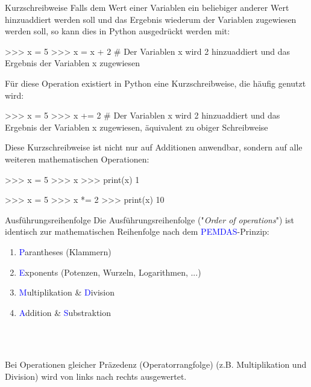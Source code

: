         \begin{frame}{Kurzschreibweise}
            Falls dem Wert einer Variablen  ein beliebiger anderer Wert hinzuaddiert werden soll und das Ergebnis wiederum der Variablen  zugewiesen werden soll, so kann dies in Python ausgedrückt werden mit:
\begin{pythoncode}
>>> x = 5
>>> x = x + 2 # Der Variablen x wird 2 hinzuaddiert und das Ergebnis der Variablen x zugewiesen
\end{pythoncode}

        Für diese Operation existiert in Python eine Kurzschreibweise, die häufig genutzt wird:
\begin{pythoncode}
>>> x = 5
>>> x += 2 # Der Variablen x wird 2 hinzuaddiert und das Ergebnis der Variablen x zugewiesen, äquivalent zu obiger Schreibweise
\end{pythoncode}

        Diese Kurzschreibweise ist nicht nur auf Additionen anwendbar, sondern auf alle weiteren mathematischen Operationen:
\begin{pythoncode}
>>> x = 5
>>> x %
>>> print(x)
1

>>> x = 5
>>> x *= 2
>>> print(x)
10
\end{pythoncode}
        \end{frame}
        
        
        \begin{frame}[fragile]{Ausführungsreihenfolge}
            Die Ausführungsreihenfolge ("\textit{Order of operations}") ist identisch zur mathematischen Reihenfolge nach dem \textcolor{blue}{PEMDAS}-Prinzip:
            
            \begin{enumerate}
                \item \textcolor{blue}{P}arantheses (Klammern)
                \item \textcolor{blue}{E}xponents (Potenzen, Wurzeln, Logarithmen, ...)
                \item \textcolor{blue}{M}ultiplikation \& \textcolor{blue}{D}ivision
                \item \textcolor{blue}{A}ddition \& \textcolor{blue}{S}ubstraktion
            \end{enumerate} \\~\
            
            Bei Operationen gleicher Präzedenz (Operatorrangfolge) (z.B. Multiplikation und Division) wird von links nach rechts ausgewertet.
            
        \end{frame}
        
